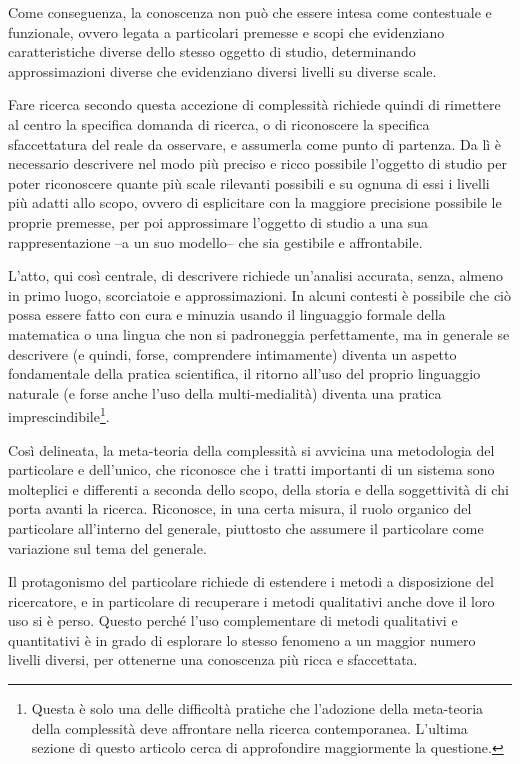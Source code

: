 \documentclass[a4paper, headings=standardclasses]{scrartcl}
\begin{document}
Come conseguenza, la conoscenza non può che essere intesa come contestuale e funzionale, ovvero legata a particolari premesse e scopi che evidenziano caratteristiche diverse dello stesso oggetto di studio, determinando approssimazioni diverse che evidenziano diversi livelli su diverse scale.

Fare ricerca secondo questa accezione di complessità richiede quindi di rimettere al centro la specifica domanda di ricerca, o di riconoscere la specifica sfaccettatura del reale da osservare, e assumerla come punto di partenza.
Da lì è necessario descrivere nel modo più preciso e ricco possibile l'oggetto di studio per poter riconoscere quante più scale rilevanti possibili e su ognuna di essi i livelli più adatti allo scopo, ovvero di esplicitare con la maggiore precisione possibile le proprie premesse, per poi approssimare l'oggetto di studio a una sua rappresentazione --a un suo modello-- che sia gestibile e affrontabile.

L'atto, qui così centrale, di descrivere richiede un'analisi accurata, senza, almeno in primo luogo, scorciatoie e approssimazioni. In alcuni contesti è possibile che ciò possa essere fatto con cura e minuzia usando il linguaggio formale della matematica o una lingua che non si padroneggia perfettamente, ma in generale se descrivere (e quindi, forse, comprendere intimamente) diventa un aspetto fondamentale della pratica scientifica, il ritorno all'uso del proprio linguaggio naturale (e forse anche l'uso della multi-medialità) diventa una pratica imprescindibile\footnote{Questa è solo una delle difficoltà pratiche che l'adozione della meta-teoria della complessità deve affrontare nella ricerca contemporanea. L'ultima sezione di questo articolo cerca di approfondire maggiormente la questione.}.

Così delineata, la meta-teoria della complessità si avvicina una metodologia del particolare e dell'unico, che riconosce che i tratti importanti di un sistema sono molteplici e differenti a seconda dello scopo, della storia e della soggettività di chi porta avanti la ricerca. Riconosce, in una certa misura, il ruolo organico del particolare all'interno del generale, piuttosto che assumere il particolare come variazione sul tema del generale. 

Il protagonismo del particolare richiede di estendere i metodi a disposizione del ricercatore, e in particolare di recuperare i metodi qualitativi anche dove il loro uso si è perso. Questo perché l'uso complementare di metodi qualitativi e quantitativi è in grado di esplorare lo stesso fenomeno a un maggior numero livelli diversi, per ottenerne una conoscenza più ricca e sfaccettata.
\end{document}

